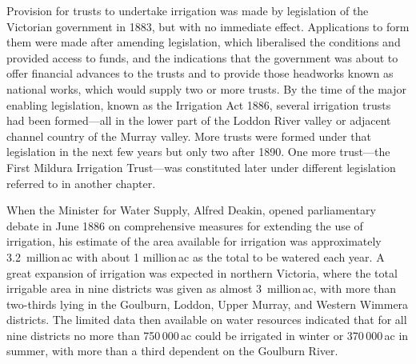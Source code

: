 Provision for trusts to undertake irrigation was made by legislation
of the Victorian government in 1883, but with no immediate effect.
Applications to form them were made after amending legislation, which
liberalised the conditions and provided access to funds, and the
indications that the government was about to offer financial advances
to the trusts and to provide those headworks known as national works,
which would supply two or more trusts.  By the time of the major
enabling legislation, known as the Irrigation Act 1886, several
irrigation trusts had been formed---all in the lower part of the
Loddon River valley or adjacent channel country of the Murray valley.
More trusts were formed under that legislation in the next few years
but only two after 1890.  One more trust---the First Mildura
Irrigation Trust---was constituted later under different legislation
referred to in another chapter.

When the Minister for Water Supply, Alfred Deakin, opened
parliamentary debate in June 1886 on comprehensive measures for
extending the use of irrigation, his estimate of the area available
for irrigation was approximately 3.2~million\,ac with about 1
million\,ac as the total to be watered each year.  A great expansion of irrigation was expected in
northern Victoria, where the total irrigable area in nine districts
was given as almost 3~million\,ac, with more than two-thirds lying in
the Goulburn, Loddon, Upper Murray, and Western Wimmera districts.
The limited data then available on water resources indicated that for
all nine districts no more than 750\,000\,ac could be irrigated in
winter or 370\,000\,ac in summer, with more than a third dependent on
the Goulburn River.

